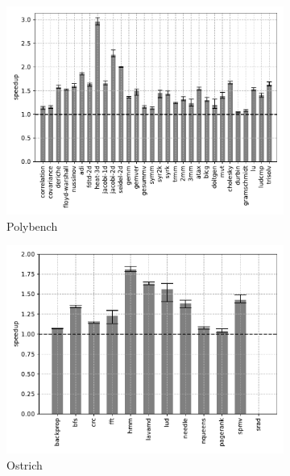 \begin{figure}
    \centering
    \begin{subfigure}[t]{\textwidth}
        \includegraphics[width=\textwidth]
        {Images/6.1.RQ1/polybench-wasmer-llvm-naive.pdf}
        \caption{Polybench}
    \end{subfigure}
    \begin{subfigure}[t]{.45\textwidth}
        \includegraphics[width=\textwidth]
        {Images/6.1.RQ1/ostrich-wasmer-llvm-naive.pdf}
        \caption{Ostrich}
    \end{subfigure}
    \begin{subfigure}[t]{.45\textwidth}

\end{subfigure}
\end{figure}
